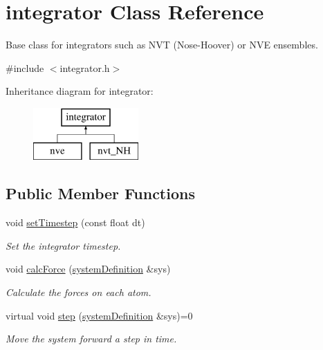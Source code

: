 \hypertarget{classintegrator}{\section{integrator Class Reference}
\label{classintegrator}
}


Base class for integrators such as N\-V\-T (Nose-\/\-Hoover) or N\-V\-E ensembles.  




{\ttfamily \#include $<$integrator.\-h$>$}

Inheritance diagram for integrator\-:\begin{figure}[H]
\begin{center}
\leavevmode
\includegraphics[height=2.000000cm]{classintegrator}
\end{center}
\end{figure}
\subsection*{Public Member Functions}
\begin{DoxyCompactItemize}
\item 
\hypertarget{classintegrator_a493bed6cf5d45fe41a9a6430bd063106}{void \hyperlink{classintegrator_a493bed6cf5d45fe41a9a6430bd063106}{set\-Timestep} (const float dt)}\label{classintegrator_a493bed6cf5d45fe41a9a6430bd063106}

\begin{DoxyCompactList}\small\item\em Set the integrator timestep. \end{DoxyCompactList}\item 
void \hyperlink{classintegrator_ad630bf7c9b7339fa34f36fe43b0d9e3c}{calc\-Force} (\hyperlink{classsystem_definition}{system\-Definition} \&sys)
\begin{DoxyCompactList}\small\item\em Calculate the forces on each atom. \end{DoxyCompactList}\item 
\hypertarget{classintegrator_a6f7170652474f15c99b94a9b9c7f4df6}{virtual void \hyperlink{classintegrator_a6f7170652474f15c99b94a9b9c7f4df6}{step} (\hyperlink{classsystem_definition}{system\-Definition} \&sys)=0}\label{classintegrator_a6f7170652474f15c99b94a9b9c7f4df6}

\begin{DoxyCompactList}\small\item\em Move the system forward a step in time. \end{DoxyCompactList}\end{DoxyCompactItemize}
